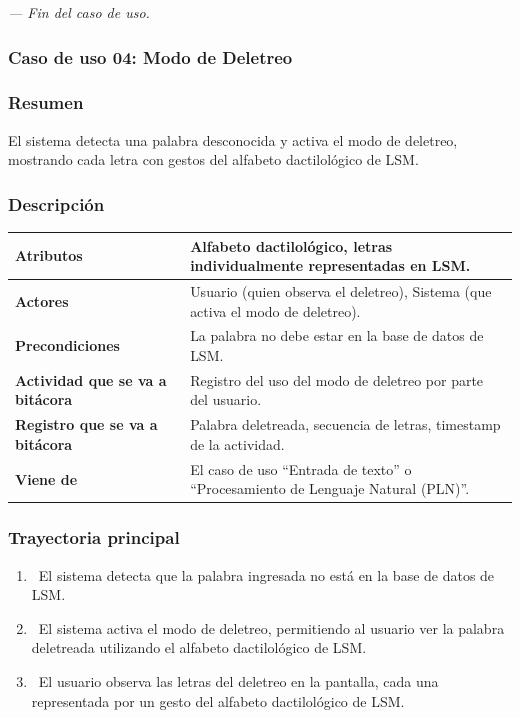 \textit{--- Fin del caso de uso.}
\newpage
\subsubsection{Caso de uso 04: Modo de Deletreo}
\subsubsection{Resumen}
El sistema detecta una palabra desconocida y activa el modo de deletreo, mostrando cada letra con gestos del alfabeto dactilológico de LSM.
\subsubsection{Descripción}
\begin{table}[h]
    \centering
    \begin{longtable}{|l|p{10cm}|}  %
    \hline
    \textbf{Atributos} & Alfabeto dactilológico, letras individualmente representadas en LSM. \\ \hline
    \textbf{Actores} & Usuario (quien observa el deletreo), Sistema (que activa el modo de deletreo). \\ \hline
    \textbf{Precondiciones} & La palabra no debe estar en la base de datos de LSM. \\ \hline
    \textbf{Actividad que se va a bitácora} & Registro del uso del modo de deletreo por parte del usuario. \\ \hline
    \textbf{Registro que se va a bitácora} & Palabra deletreada, secuencia de letras, timestamp de la actividad. \\ \hline
    \textbf{Viene de} & El caso de uso “Entrada de texto” o “Procesamiento de Lenguaje Natural (PLN)”. \\ \hline
     
    \end{longtable}
\end{table}
  
\subsubsection{Trayectoria principal}
\begin{enumerate}[label=\textbf{\arabic*}, leftmargin=1.5cm]
    \item \UCsystem \ El sistema detecta que la palabra ingresada no está en la base de datos de LSM.
    
    \item \UCsystem \ El sistema activa el modo de deletreo, permitiendo al usuario ver la palabra deletreada utilizando el alfabeto dactilológico de LSM.
    
    \item \UCactor \ El usuario observa las letras del deletreo en la pantalla, cada una representada por un gesto del alfabeto dactilológico de LSM.

\end{enumerate}

